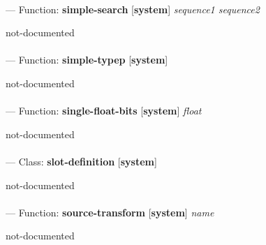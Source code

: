 \paragraph{}
\label{SYSTEM:SIMPLE-SEARCH}
--- Function: \textbf{simple-search} [\textbf{system}] \textit{sequence1 sequence2}

\begin{adjustwidth}{5em}{5em}
not-documented
\end{adjustwidth}

\paragraph{}
\label{SYSTEM:SIMPLE-TYPEP}
--- Function: \textbf{simple-typep} [\textbf{system}] \textit{}

\begin{adjustwidth}{5em}{5em}
not-documented
\end{adjustwidth}

\paragraph{}
\label{SYSTEM:SINGLE-FLOAT-BITS}
--- Function: \textbf{single-float-bits} [\textbf{system}] \textit{float}

\begin{adjustwidth}{5em}{5em}
not-documented
\end{adjustwidth}

\paragraph{}
\label{SYSTEM:SLOT-DEFINITION}
--- Class: \textbf{slot-definition} [\textbf{system}] \textit{}

\begin{adjustwidth}{5em}{5em}
not-documented
\end{adjustwidth}

\paragraph{}
\label{SYSTEM:SOURCE-TRANSFORM}
--- Function: \textbf{source-transform} [\textbf{system}] \textit{name}

\begin{adjustwidth}{5em}{5em}
not-documented
\end{adjustwidth}

